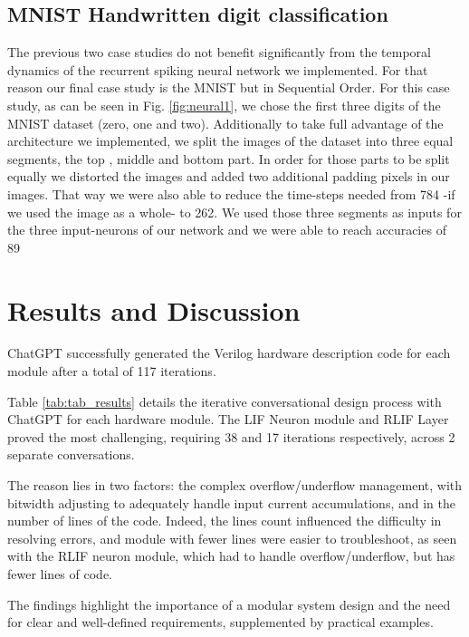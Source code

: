 \subsection{MNIST Handwritten digit classification}
The previous two case studies do not benefit significantly from the temporal dynamics of the recurrent spiking neural network we implemented. For that reason our final case study is the MNIST but in Sequential Order. For this case study, as can be seen in Fig. \ref{fig:neural1}, we chose the first three digits of the MNIST dataset (zero, one and two). Additionally to take full advantage of the architecture we implemented, we split the images of the dataset into three equal segments, the top , middle and bottom part. In order for those parts to be split equally we distorted the images and added two additional padding pixels in our images.  That way we were also able to reduce the time-steps needed from 784 -if we used the image as a whole- to 262. We used those three segments as inputs for the three input-neurons of our network and we were able to reach accuracies of 89\


\section{Results and Discussion}


ChatGPT successfully generated the Verilog hardware description code for each module after a total of 117 iterations. 

Table \ref{tab:tab_results} details the iterative conversational design process with ChatGPT for each hardware module.
The LIF Neuron module and RLIF Layer proved the most challenging, requiring 38 and 17 iterations respectively, across 2 separate conversations.

The reason lies in two factors: the complex overflow/underflow management, with bitwidth adjusting to adequately handle input current accumulations, and in the number of lines of the code.
Indeed, the lines count influenced the difficulty in resolving errors, and module with fewer lines were easier to troubleshoot, as seen with the RLIF neuron module, which had to handle overflow/underflow, but has fewer lines of code.

The findings highlight the importance of a modular system design and the need for clear and well-defined requirements, supplemented by practical examples.





